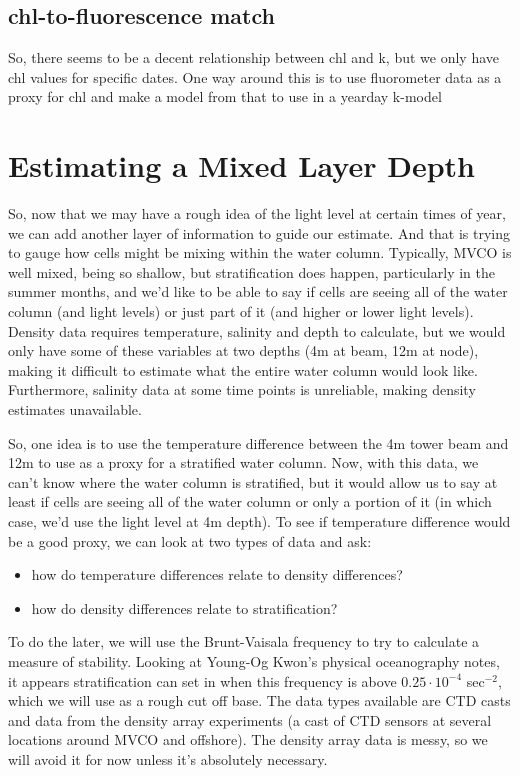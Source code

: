 \documentclass[11pt]{article}
\begin{document}
\subsection{chl-to-fluorescence match}

So, there seems to be a decent relationship between chl and k, but we only have chl values for specific dates. One way around this is to use fluorometer data as a proxy for chl and make a model from that to use in a yearday k-model


\section{Estimating a Mixed Layer Depth}

So, now that we may have a rough idea of the light level at certain times of year, we can add another layer of information to guide our estimate. And that is trying to gauge how cells might be mixing within the water column. Typically, MVCO is well mixed, being so shallow, but stratification does happen, particularly in the summer months, and we'd like to be able to say if cells are seeing all of the water column (and light levels) or just part of it (and higher or lower light levels). Density data requires temperature, salinity and depth to calculate, but we would only have some of these variables at two depths (4m at beam, 12m at node), making it difficult to estimate what the entire water column would look like. Furthermore, salinity data at some time points is unreliable, making density estimates unavailable.

So, one idea is to use the temperature difference between the 4m tower beam and 12m to use as a proxy for a stratified water column. Now, with this data, we can't know where the water column is stratified, but it would allow us to say at least if cells are seeing all of the water column or only a portion of it (in which case, we'd use the light level at 4m depth). To see if temperature difference would be a good proxy, we can look at two types of data and ask:
\begin{itemize}
\item how do temperature differences relate to density differences?
\item how do density differences relate to stratification?
\end{itemize}

To do the later, we will use the Brunt-Vaisala frequency to try to calculate a measure of stability. Looking at Young-Og Kwon's physical oceanography notes, it appears stratification can set in when this frequency is above $0.25 \cdot 10^{-4}$ sec$^{-2}$, which we will use as a rough cut off base. The data types available are CTD casts and data from the density array experiments (a cast of CTD sensors at several locations around MVCO and offshore). The density array data is messy, so we will avoid it for now unless it's absolutely necessary.
\end{document}
